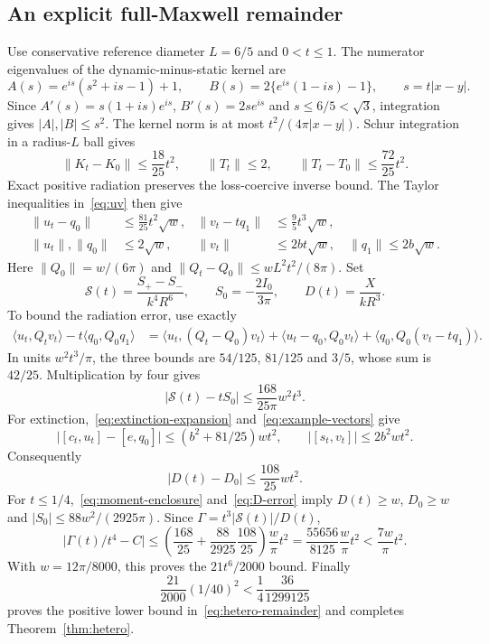 \documentclass[11pt]{article}
\newcommand{\ip}[2]{\langle #1,#2\rangle}
\newcommand{\bilin}[2]{[#1,#2]}
\newcommand{\norm}[1]{\lVert #1\rVert}
\newcommand{\abs}[1]{\lvert #1\rvert}
\begin{document}
\subsection{An explicit full-Maxwell remainder}
Use conservative reference diameter $L=6/5$ and $0<t\leq1$. The numerator eigenvalues of the dynamic-minus-static kernel are
\[
 A(s)=e^{is}(s^2+is-1)+1,\qquad
 B(s)=2\{e^{is}(1-is)-1\},\qquad s=t\abs{x-y}.
\]
Since $A'(s)=s(1+is)e^{is}$, $B'(s)=2se^{is}$ and $s\leq6/5<\sqrt3$, integration gives $\abs A,\abs B\leq s^2$. The kernel norm is at most $t^2/(4\pi\abs{x-y})$. Schur integration in a radius-$L$ ball gives
\begin{equation}\label{eq:example-inverses}
 \norm{K_t-K_0}\leq\frac{18}{25}t^2,\qquad
 \norm{T_t}\leq2,\qquad\norm{T_t-T_0}\leq\frac{72}{25}t^2.
\end{equation}
Exact positive radiation preserves the loss-coercive inverse bound. The Taylor inequalities in~\eqref{eq:uv} then give
\begin{equation}\label{eq:example-vectors}
 \begin{aligned}
 \norm{u_t-q_0}&\leq\frac{81}{25}t^2\sqrt w,&
 \norm{v_t-tq_1}&\leq\frac95t^3\sqrt w,\\
 \norm{u_t},\norm{q_0}&\leq2\sqrt w,&
 \norm{v_t}&\leq2bt\sqrt w,\quad\norm{q_1}\leq2b\sqrt w.
 \end{aligned}
\end{equation}
Here $\norm{Q_0}=w/(6\pi)$ and $\norm{Q_t-Q_0}\leq wL^2t^2/(8\pi)$. Set
\[
 \mathcal S(t)=\frac{S_+-S_-}{k^4R^6},\qquad
 S_0=-\frac{2I_0}{3\pi},\qquad D(t)=\frac{X}{kR^3}.
\]
To bound the radiation error, use exactly
\begin{align*}
 \ip{u_t}{Q_tv_t}-t\ip{q_0}{Q_0q_1}
 &=\ip{u_t}{(Q_t-Q_0)v_t}
 +\ip{u_t-q_0}{Q_0v_t}
 +\ip{q_0}{Q_0(v_t-tq_1)}.
\end{align*}
In units $w^2t^3/\pi$, the three bounds are $54/125$, $81/125$ and $3/5$, whose sum is $42/25$. Multiplication by four gives
\begin{equation}\label{eq:S-error}
 \abs{\mathcal S(t)-tS_0}\leq\frac{168}{25\pi}w^2t^3.
\end{equation}
For extinction,~\eqref{eq:extinction-expansion} and~\eqref{eq:example-vectors} give
\[
 \abs{\bilin{c_t}{u_t}-\bilin e{q_0}}
 \leq(b^2+81/25)wt^2,\qquad
 \abs{\bilin{s_t}{v_t}}\leq2b^2wt^2.
\]
Consequently
\begin{equation}\label{eq:D-error}
 \abs{D(t)-D_0}\leq\frac{108}{25}wt^2.
\end{equation}
For $t\leq1/4$,~\eqref{eq:moment-enclosure} and~\eqref{eq:D-error} imply $D(t)\geq w$, $D_0\geq w$ and $\abs{S_0}\leq88w^2/(2925\pi)$. Since $\Gamma=t^3\abs{\mathcal S(t)}/D(t)$,
\begin{equation}\label{eq:division}
 \abs{\Gamma(t)/t^4-C}
 \leq\left(\frac{168}{25}+\frac{88}{2925}\frac{108}{25}\right)
 \frac w\pi t^2
 =\frac{55656}{8125}\frac w\pi t^2
 <\frac{7w}{\pi}t^2.
\end{equation}
With $w=12\pi/8000$, this proves the $21t^6/2000$ bound. Finally
\[
 \frac{21}{2000}(1/40)^2<\frac14\frac{36}{1299125}
\]
proves the positive lower bound in~\eqref{eq:hetero-remainder} and completes Theorem~\ref{thm:hetero}.
\end{document}
